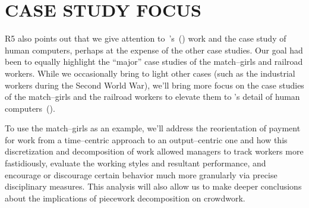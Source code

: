 \documentclass[11pt]{article}
\begin{document}

\section*{CASE STUDY FOCUS}
R5 also points out that we give attention to~\citeauthor{grier2013computers}'s~(\citeyear{grier2013computers}) work and
the case study of human computers,
perhaps at the expense of the other case studies.
Our goal had been to equally highlight the ``major'' case studies of the match--girls and railroad workers.
While we occasionally bring to light other cases
(such as the industrial workers during the Second World War),
we'll bring more focus on the case studies of
the match--girls and the railroad workers
to elevate them to
\citeauthor{grier2013computers}'s detail of human computers~(\citeyear{grier2013computers}).

To use the match--girls as an example, we'll address
the reorientation of payment for work from
a time--centric approach to
an output--centric one and how
this discretization and decomposition of work allowed managers
to track workers more fastidiously,
evaluate the working styles and resultant performance,
and encourage or discourage certain behavior much more granularly via
precise disciplinary measures.
This analysis will also
allow us to make deeper conclusions about
the implications of piecework decomposition on crowdwork.
\end{document}
